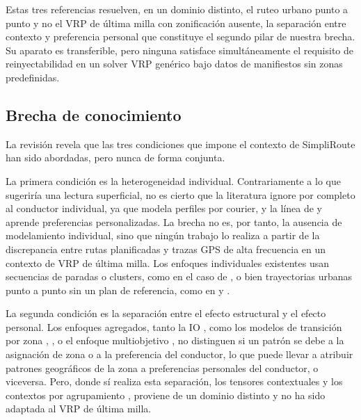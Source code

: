 Estas tres referencias resuelven, en un dominio distinto, el ruteo urbano punto a punto y no el VRP de última milla con zonificación ausente, la separación entre contexto y preferencia personal que constituye el segundo pilar de nuestra brecha. Su aparato es transferible, pero ninguna satisface simultáneamente el requisito de reinyectabilidad en un solver VRP genérico bajo datos de manifiestos sin zonas predefinidas.

\subsection{Brecha de conocimiento}

La revisión revela que las tres condiciones que impone el contexto de SimpliRoute han sido abordadas, pero nunca de forma conjunta.

La primera condición es la heterogeneidad individual. Contrariamente a lo que sugeriría una lectura superficial, no es cierto que la literatura ignore por completo al conductor individual, ya que \cite{pegadobardayo2024predictive} modela perfiles por courier, y la línea de  y  aprende preferencias personalizadas. La brecha no es, por tanto, la ausencia de modelamiento individual, sino que ningún trabajo lo realiza a partir de la discrepancia entre rutas planificadas y trazas GPS de alta frecuencia en un contexto de VRP de última milla. Los enfoques individuales existentes usan secuencias de paradas o clusters, como en el caso de , o bien trayectorias urbanas punto a punto sin un plan de referencia, como en  y .

La segunda condición es la separación entre el efecto estructural y el efecto personal. Los enfoques agregados, tanto la IO \cite{chen2021inverse} \cite{zattoni2025inverse}, como los modelos de transición por zona \cite{canoy2023learn},  \cite{ghosh2023learn}, o el enfoque multiobjetivo \cite{nourmohammadi2025data}, no distinguen si un patrón se debe a la asignación de zona o a la preferencia del conductor, lo que puede llevar a atribuir patrones geográficos de la zona a preferencias personales del conductor, o viceversa. Pero, donde sí realiza esta separación, los tensores contextuales \cite{guo2020contextaware} y los contextos por agrupamiento \cite{yang2015toward}, proviene de un dominio distinto y no ha sido adaptada al VRP de última milla.

